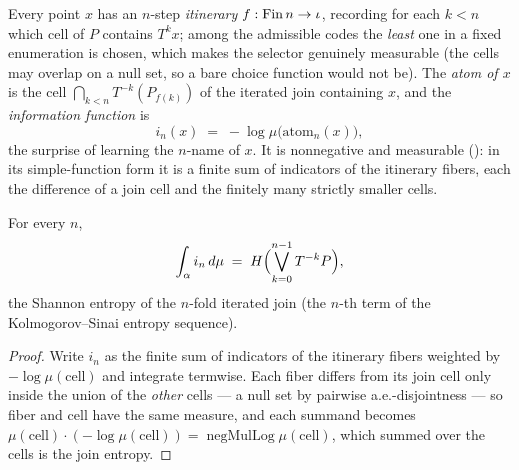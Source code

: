 \begin{definition}\label{infoFun}
  \leanok
  Every point \(x\) has an \(n\)-step \emph{itinerary}
   \(f : \operatorname{Fin} n \to \iota\), recording for each
  \(k < n\) which cell of \(P\) contains \(T^k x\); among the admissible codes the
  \emph{least} one in a fixed enumeration is chosen, which makes the selector genuinely
  measurable (the cells may overlap on a null set, so a bare choice function would not be).
  The \emph{atom of \(x\)} is the cell \(\bigcap_{k<n} T^{-k}(P_{f(k)})\) of the iterated join
  containing \(x\), and the \emph{information function} is
  \[
    i_n(x) \;=\; -\log \mu\bigl(\mathrm{atom}_n(x)\bigr),
  \]
  the surprise of learning the \(n\)-name of \(x\). It is nonnegative and measurable
  (): in its simple-function form it is a finite
  sum of indicators of the itinerary fibers, each the difference of a join cell and the finitely
  many strictly smaller cells.
\end{definition}

\begin{theorem}\label{integral_infoFun_eq}
  \leanok
  For every \(n\),
  \[
    \int_\alpha i_n \,d\mu \;=\; H\Bigl(\bigvee_{k=0}^{n-1} T^{-k}P\Bigr),
  \]
  the Shannon entropy of the \(n\)-fold iterated join (the \(n\)-th term of the
  Kolmogorov--Sinai entropy sequence).
\end{theorem}
\begin{proof}\leanok
  Write \(i_n\) as the finite sum of indicators of the itinerary fibers weighted by
  \(-\log\mu(\text{cell})\) and integrate termwise. Each fiber differs from its join cell only
  inside the union of the \emph{other} cells --- a null set by pairwise a.e.-disjointness --- so
  fiber and cell have the same measure, and each summand becomes
  \(\mu(\text{cell})\cdot(-\log\mu(\text{cell})) = \operatorname{negMulLog}\mu(\text{cell})\),
  which summed over the cells is the join entropy.
\end{proof}

